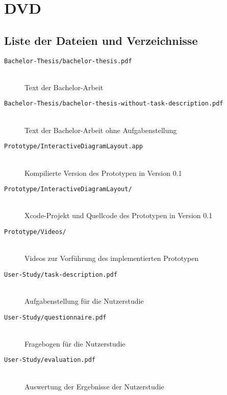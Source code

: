 
\chapter{DVD}
\label{chapter:dvd}

\section{Liste der Dateien und Verzeichnisse}

\begin{description}
    \item[\texttt{Bachelor-Thesis/bachelor-thesis.pdf}] 
        \hfill \\ Text der Bachelor-Arbeit
    \item[\texttt{Bachelor-Thesis/bachelor-thesis-without-task-description.pdf}] 
        \hfill \\ Text der Bachelor-Arbeit ohne Aufgabenstellung
    \item[\texttt{Prototype/InteractiveDiagramLayout.app}]
        \hfill \\ Kompilierte Version des Prototypen in Version 0.1
    \item[\texttt{Prototype/InteractiveDiagramLayout/}] 
        \hfill \\ Xcode-Projekt und 
Quellcode des Prototypen in Version 0.1
    \item[\texttt{Prototype/Videos/}] 
        \hfill \\ Videos zur Vorführung des implementierten Prototypen
    \item[\texttt{User-Study/task-description.pdf}] 
        \hfill \\ Aufgabenstellung für die Nutzerstudie
    \item[\texttt{User-Study/questionnaire.pdf}]
        \hfill \\ Fragebogen für die Nutzerstudie
    \item[\texttt{User-Study/evaluation.pdf}]
        \hfill \\ Auswertung der Ergebnisse der Nutzerstudie
\end{description}
